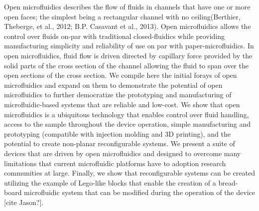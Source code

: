 Open microfluidics describes the flow of fluids in channels that have one or more open faces; the simplest being a rectangular channel with no ceiling(Berthier, Theberge, et al., 2012; B.P. Casavant et al., 2013). Open microfluidics allows the control over fluids on-par with traditional closed-fluidics while providing manufacturing simplicity and reliability of use on par with paper-microfluidics. In open microfluidics, fluid flow is driven directed by capillary force provided by the solid parts of the cross section of the channel allowing the fluid to span over the open sections of the cross section. We compile here the initial forays of open microfluidics and expand on them to demonstrate the potential of open microfluidics to further democratize the prototyping and manufacturing of microfluidic-based systems that are reliable and low-cost. We show that open microfluidics is a ubiquitous technology that enables control over fluid handling, access to the sample throughout the device operation, simple manufacturing and prototyping (compatible with injection molding and 3D printing), and the potential to create non-planar reconfigurable systems. We present a suite of devices that are driven by open microfluidics and designed to overcome many limitations that current microfluidic platforms have to adoption research communities at large. Finally, we show that reconfigurable systems can be created utilizing the example of Lego-like blocks that enable the creation of a bread-board microfluidic system that can be modified during the operation of the device [cite Jason?].
